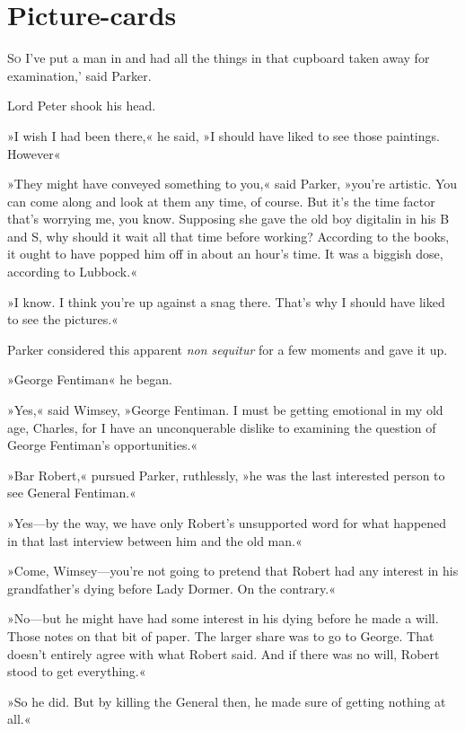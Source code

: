 \chapter{Picture-cards}

\lettrine[lines=4,ante=‘]{S}{o} I've put a man in and had all the things in that cupboard taken away for examination,' said Parker.

\zz
Lord Peter shook his head.

\zz
»I wish I had been there,« he said, »I should have liked to see those paintings. However\longdash«

»They might have conveyed something to you,« said Parker, »you're artistic. You can come along and look at them any time, of course. But it's the time factor that's worrying me, you know. Supposing she gave the old boy digitalin in his B and S, why should it wait all that time before working? According to the books, it ought to have popped him off in about an hour's time. It was a biggish dose, according to Lubbock.«

»I know. I think you're up against a snag there. That's why I should have liked to see the pictures.«

Parker considered this apparent \textit{non sequitur} for a few moments and gave it up.

»George Fentiman\longdash« he began.

»Yes,« said Wimsey, »George Fentiman. I must be getting emotional in my old age, Charles, for I have an unconquerable dislike to examining the question of George Fentiman's opportunities.«

»Bar Robert,« pursued Parker, ruthlessly, »he was the last interested person to see General Fentiman.«

»Yes—by the way, we have only Robert's unsupported word for what happened in that last interview between him and the old man.«

»Come, Wimsey—you're not going to pretend that Robert had any interest in his grandfather's dying before Lady Dormer. On the contrary.«

»No—but he might have had some interest in his dying before he made a will. Those notes on that bit of paper. The larger share was to go to George. That doesn't entirely agree with what Robert said. And if there was no will, Robert stood to get everything.«

»So he did. But by killing the General then, he made sure of getting nothing at all.«

